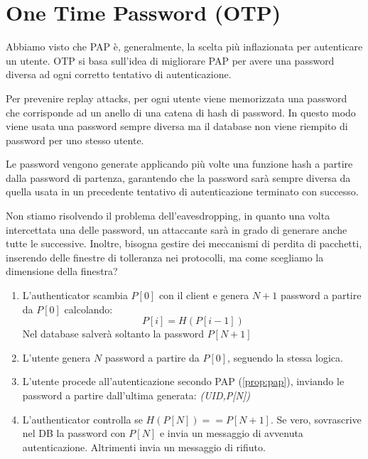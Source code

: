 \section{One Time Password (OTP)}
Abbiamo visto che PAP è, generalmente, la scelta più inflazionata per autenticare un utente. OTP si basa sull'idea di migliorare PAP per avere una password diversa ad ogni corretto tentativo di autenticazione. 
\begin{remark}
Per prevenire replay attacks, per ogni utente viene memorizzata una password che corrisponde ad un anello di una catena di hash di password. In questo modo viene usata una password sempre diversa ma il database non viene riempito di password per uno stesso utente.
\end{remark}
\begin{definition}
Le password vengono generate applicando più volte una funzione hash a partire dalla password di partenza, garantendo che la password sarà sempre diversa da quella usata in un precedente tentativo di autenticazione terminato con successo.
\end{definition}
\begin{remark}
Non stiamo risolvendo il problema dell'eavesdropping, in quanto una volta intercettata una delle password, un attaccante sarà in grado di generare anche tutte le successive. Inoltre, bisogna gestire dei meccanismi di perdita di pacchetti, inserendo delle finestre di tolleranza nei protocolli, ma come scegliamo la dimensione della finestra?
\end{remark}
\begin{proposition}\label{prop:otp}
\begin{enumerate}
    \item L'authenticator scambia $P[0]$ con il client e genera $N+1$ password a partire da $P[0]$ calcolando:
    \begin{equation*}
        P[i]=H(P[i-1])
    \end{equation*}
    Nel database salverà soltanto la password $P[N+1]$
    \item L'utente genera $N$ password a partire da $P[0]$, seguendo la stessa logica.
    \item L'utente procede all'autenticazione secondo PAP (\cref{prop:pap}), inviando le password a partire dall'ultima generata: \textit{(UID,P[N])}
    \item L'authenticator controlla se $H(P[N])==P[N+1]$. Se vero, sovrascrive nel DB la password con $P[N]$ e invia un messaggio di avvenuta autenticazione. Altrimenti invia un messaggio di rifiuto.
\end{enumerate}
\end{proposition}
